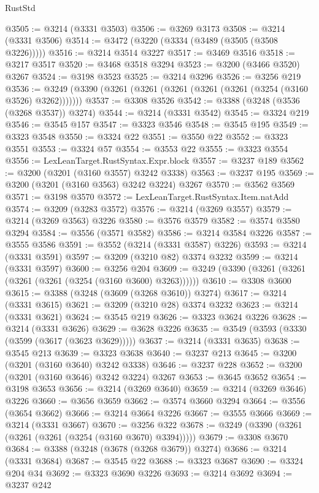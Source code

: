 \begin{lexlean}{RustStd}
\begin{coremodule}
{\begin{coremodule}
{{{{{{{{{{{{{{{{{{{{{{{{{@3505 := @3214 (@3331 @3503)
@3506 := @3269 @3173
@3508 := @3214 (@3331 @3506)
@3514 := @3472 (@3220 (@3334 (@3489 (@3505 (@3508 @3226)))))
@3516 := @3214 @3514 @3227
@3517 := @3469 @3516
@3518 := @3217 @3517
@3520 := @3468 @3518 @3294
@3523 := @3200 (@3466 @3520) @3267
@3524 := @3198 @3523
@3525 := @3214 @3296
@3526 := @3256 @219
@3536 := @3249 (@3390 (@3261 (@3261 (@3261 (@3261 (@3261 (@3254 (@3160 @3526) @3262)))))))
@3537 := @3308 @3526
@3542 := @3388 (@3248 (@3536 (@3268 @3537)) @3274)
@3544 := @3214 (@3331 @3542)
@3545 := @3324 @219
@3546 := @3545 @157
@3547 := @3323 @3546
@3548 := @3545 @195
@3549 := @3323 @3548
@3550 := @3324 @22
@3551 := @3550 @22
@3552 := @3323 @3551
@3553 := @3324 @57
@3554 := @3553 @22
@3555 := @3323 @3554
@3556 := LexLeanTarget.RustSyntax.Expr.block
@3557 := @3237 @189
@3562 := @3200 (@3201 (@3160 @3557) @3242 @3338)
@3563 := @3237 @195
@3569 := @3200 (@3201 (@3160 @3563) @3242 @3224) @3267
@3570 := @3562 @3569
@3571 := @3198 @3570
@3572 := LexLeanTarget.RustSyntax.Item.natAdd
@3574 := @3209 (@3283 @3572)
@3576 := @3214 (@3269 @3557)
@3579 := @3214 (@3269 @3563) @3226
@3580 := @3576 @3579
@3582 := @3574 @3580 @3294
@3584 := @3556 (@3571 @3582)
@3586 := @3214 @3584 @3226
@3587 := @3555 @3586
@3591 := @3552 (@3214 (@3331 @3587) @3226)
@3593 := @3214 (@3331 @3591)
@3597 := @3209 (@3210 @82) @3374 @3232
@3599 := @3214 (@3331 @3597)
@3600 := @3256 @204
@3609 := @3249 (@3390 (@3261 (@3261 (@3261 (@3261 (@3254 (@3160 @3600) @3263))))))
@3610 := @3308 @3600
@3615 := @3388 (@3248 (@3609 (@3268 @3610)) @3274)
@3617 := @3214 (@3331 @3615)
@3621 := @3209 (@3210 @28) @3374 @3232
@3623 := @3214 (@3331 @3621)
@3624 := @3545 @219
@3626 := @3323 @3624 @3226
@3628 := @3214 (@3331 @3626)
@3629 := @3628 @3226
@3635 := @3549 (@3593 (@3330 (@3599 (@3617 (@3623 @3629)))))
@3637 := @3214 (@3331 @3635)
@3638 := @3545 @213
@3639 := @3323 @3638
@3640 := @3237 @213
@3645 := @3200 (@3201 (@3160 @3640) @3242 @3338)
@3646 := @3237 @228
@3652 := @3200 (@3201 (@3160 @3646) @3242 @3224) @3267
@3653 := @3645 @3652
@3654 := @3198 @3653
@3656 := @3214 (@3269 @3640)
@3659 := @3214 (@3269 @3646) @3226
@3660 := @3656 @3659
@3662 := @3574 @3660 @3294
@3664 := @3556 (@3654 @3662)
@3666 := @3214 @3664 @3226
@3667 := @3555 @3666
@3669 := @3214 (@3331 @3667)
@3670 := @3256 @322
@3678 := @3249 (@3390 (@3261 (@3261 (@3261 (@3254 (@3160 @3670) @3394)))))
@3679 := @3308 @3670
@3684 := @3388 (@3248 (@3678 (@3268 @3679)) @3274)
@3686 := @3214 (@3331 @3684)
@3687 := @3545 @22
@3688 := @3323 @3687
@3690 := @3324 @204 @34
@3692 := @3323 @3690 @3226
@3693 := @3214 @3692
@3694 := @3237 @242
}}}}}}}}}}}}}}}}}}}}}}}}}
\end{coremodule}}
\end{coremodule}
\end{lexlean}
